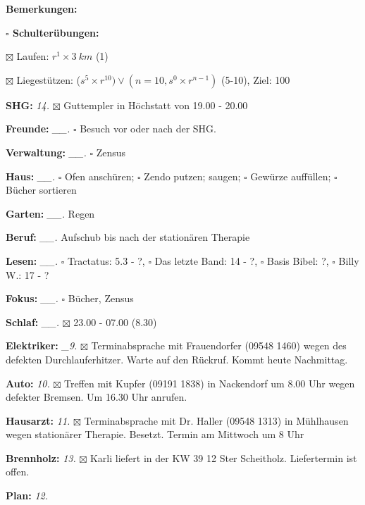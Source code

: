 \documentclass[10pt,a4paper]{article}
\newcommand\prop[1] {{\color {alizarin} {\bf #1}}}             %
\newcommand\opti[1] {{\color {amethyst} {\bf #1}}}             %
\newcommand\mand[1] {{\color {burntorange} {\bf #1}}}          %
\newcommand\bottomspace{\vskip 4pt}
\newcommand\n[1] { {\sl #1.} \hskip 5pt }
\begin{document}
\begin{mdframed}[style=daystyle]
\begin{labeling}{{\mand {Bemerkungen:}}}
\begin{minipage}{0.75\textwidth}
\begin{labeling}{\prop {$\square$ {Schulterübungen:}}}
      \item[$\boxtimes$ Laufen:]          $r^1 \times 3\ km$ (1)
      \item[$\boxtimes$ Liegestützen:]    ($s^5 \times r^{10}) \vee (n=10, s^0 \times r^{n-1})$ (5-10), Ziel: 100
      \end{labeling}
    \end{minipage}
    \bottomspace    
  \item[{\mand {SHG:}}]            \n{14} $\boxtimes$ Guttempler in Höchstatt von 19.00 - 20.00
  \item[{\mand {Freunde:}}]      \n{\_\_} $\square$ Besuch vor oder nach der SHG.
  \item[{\mand {Verwaltung:}}]   \n{\_\_} $\square$ Zensus
  \item[{\mand {Haus:}}]         \n{\_\_} $\square$ Ofen anschüren; $\square$ Zendo putzen;
      saugen; $\square$ Gewürze auffüllen; $\square$ Bücher sortieren
  \item[{\mand {Garten:}}]       \n{\_\_} Regen
  \item[{\mand {Beruf:}}]        \n{\_\_} Aufschub bis nach der stationären Therapie
  \item[{\mand {Lesen:}}]        \n{\_\_} $\square$ Tractatus: 5.3 - ?,
      $\square$ Das letzte Band: 14 - ?, $\square$ Basis Bibel: ?, $\square$ Billy W.: 17 - ?
  \item[{\mand {Fokus:}}]        \n{\_\_} $\square$ Bücher, Zensus
  \item[{\mand {Schlaf:}}]       \n{\_\_} $\boxtimes$ 23.00 - 07.00 (8.30)
  \item[{\opti {Elektriker:}}]    \n{\_9} $\boxtimes$ Terminabsprache mit Frauendorfer (09548 1460) wegen
      des defekten Durchlauferhitzer. Warte auf den Rückruf. Kommt heute Nachmittag.
  \item[{\opti {Auto:}}]           \n{10} $\boxtimes$ Treffen mit Kupfer (09191 1838) in Nackendorf um 8.00 Uhr
      wegen defekter Bremsen. Um 16.30 Uhr anrufen.
  \item[{\opti {Hausarzt:}}]       \n{11} $\boxtimes$ Terminabsprache mit Dr. Haller (09548 1313) in Mühlhausen
    wegen stationärer Therapie. Besetzt. Termin am Mittwoch um 8 Uhr
  \item[{\opti {Brennholz:}}]      \n{13} $\boxtimes$ Karli liefert in der KW 39 12 Ster Scheitholz.
    Liefertermin ist offen.
  \item[{\mand {Plan:}}]           \n{12}

\end{labeling}
\end{mdframed}
\end{document}
